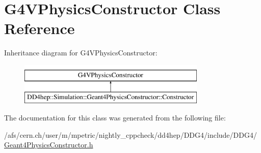 \hypertarget{class_g4_v_physics_constructor}{}\section{G4\+V\+Physics\+Constructor Class Reference}
\label{class_g4_v_physics_constructor}
Inheritance diagram for G4\+V\+Physics\+Constructor\+:\begin{figure}[H]
\begin{center}
\leavevmode
\includegraphics[height=2.000000cm]{class_g4_v_physics_constructor}
\end{center}
\end{figure}


The documentation for this class was generated from the following file\+:\begin{DoxyCompactItemize}
\item 
/afs/cern.\+ch/user/m/mpetric/nightly\+\_\+cppcheck/dd4hep/\+D\+D\+G4/include/\+D\+D\+G4/\hyperlink{_geant4_physics_constructor_8h}{Geant4\+Physics\+Constructor.\+h}\end{DoxyCompactItemize}
